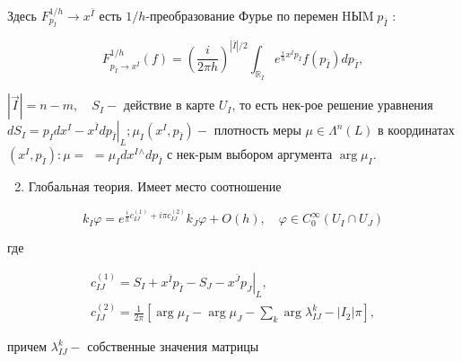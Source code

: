 \documentclass[10pt]{article}
\begin{document}
Здесь $F_{p_{\bar{I}}}^{1 / h} \rightarrow x^{\bar{I}}$ есть $1 / h$-преобразование Фурье по перемен$\operatorname{HЫM} p_{\bar{I}}$ :



\[

F_{p_{\bar{I}} \rightarrow x^{\bar{I}}}^{1 / h}(f)=\left(\frac{i}{2 \pi h}\right)^{|\bar{I}| / 2} \int_{\mathbb{R}_{\bar{I}}} e^{\frac{i}{h} x^{\bar{I}} p_{\bar{I}}} f\left(p_{\bar{I}}\right) d p_{\bar{I}},

\]



$|\vec{I}|=n-m, \quad S_{I}-$ действие в карте $U_{I}$, то есть нек-рое решение уравнения $d S_{I}=p_{I} d x^{I}-\left.x^{\bar{I}} d p_{\bar{I}}\right|_{L} ; \mu_{I}\left(x^{I}, p_{\bar{I}}\right)-$ плотность меры $\mu \in \Lambda^{n}(L)$ в координатах $\left(x^{I}, p_{\bar{I}}\right): \mu=$ $=\mu_{I} d x^{I}{ }^{\wedge} d p_{\bar{I}}$ с нек-рым выбором аргумента $\arg \mu_{I}$.



\begin{enumerate}

  \setcounter{enumi}{1}

  \item Глобальная теория. Имеет место соотношение

\end{enumerate}



\[

k_{I} \varphi=e^{\frac{i}{h} c_{I J}^{(1)}+i \pi c_{I J}^{(2)}} k_{J} \varphi+O(h), \quad \varphi \in C_{0}^{\infty}\left(U_{I} \cap U_{J}\right)

\]



где



\[

\begin{gathered}

c_{I J}^{(1)}=S_{I}+x^{\bar{I}} p_{\bar{I}}-S_{J}-\left.x^{\bar{J}} p_{J}\right|_{L}, \\

c_{I J}^{(2)}=\frac{1}{2 \pi}\left[\arg \mu_{I}-\arg \mu_{J}-\sum_{k} \arg \lambda_{I J}^{k}-\left|I_{2}\right| \pi\right],

\end{gathered}

\]



причем $\lambda_{I J}^{k}-$ собственные значения матрицы
\end{document}
